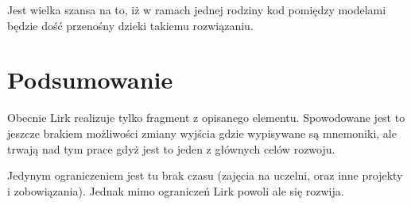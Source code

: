 \documentclass[11pt]{article}
\begin{document}
Jest wielka szansa na to, iż w ramach jednej rodziny kod pomiędzy modelami będzie dość przenośny dzieki takiemu rozwiązaniu.

\section{Podsumowanie}
Obecnie Lirk realizuje tylko fragment z opisanego elementu. 
Spowodowane jest to jeszcze brakiem możliwości zmiany wyjścia gdzie wypisywane są mnemoniki, ale trwają nad tym prace gdyż jest to jeden z głównych celów rozwoju. 

Jedynym ograniczeniem jest tu brak czasu (zajęcia na uczelni, oraz inne projekty i zobowiązania). Jednak mimo ograniczeń Lirk powoli ale się rozwija.
\end{document}

